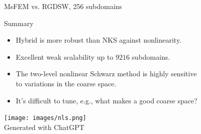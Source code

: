 \begin{frame}{MsFEM vs. RGDSW, 256 subdomains}
	\begin{figure}
		\centering
		
		\label{fig:msfem-vs-rgdsw}
	\end{figure}
\end{frame}

\begin{frame}{Summary}
	\begin{itemize}
		\item Hybrid is more robust than NKS against nonlinearity.
		\item Excellent weak scalability up to $9216$ subdomains. %
		\item The two-level nonlinear Schwarz method is highly sensitive\\to variations in the coarse space.
		\item It's difficult to tune, e.g., what makes a good coarse space?%
	\end{itemize}
	\vspace{2mm}
	\begin{center}
		\texttt{[image: images/nls.png]}\\
		{\tiny \vspace{-2mm}\hspace{-4.6cm}Generated with ChatGPT}
	\end{center}
\end{frame}
